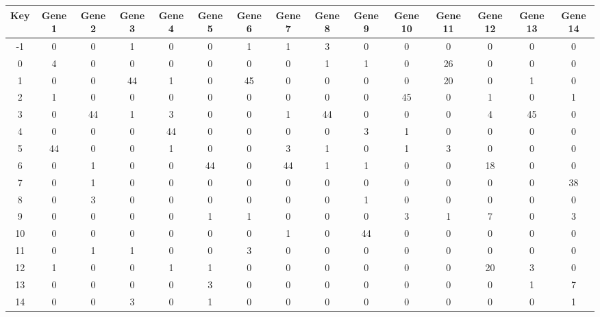 \begin{tabular}{|c|c|c|c|c|c|c|c|c|c|c|c|c|c|c|}
\hline
Key & Gene 1 & Gene 2 & Gene 3 & Gene 4 & Gene 5 & Gene 6 & Gene 7 & Gene 8 & Gene 9 & Gene 10 & Gene 11 & Gene 12 & Gene 13 & Gene 14 \\
\hline
-1 & 0 & 0 & 1 & 0 & 0 & 1 & 1 & 3 & 0 & 0 & 0 & 0 & 0 & 0 \\
0 & 4 & 0 & 0 & 0 & 0 & 0 & 0 & 1 & 1 & 0 & 26 & 0 & 0 & 0 \\
1 & 0 & 0 & 44 & 1 & 0 & 45 & 0 & 0 & 0 & 0 & 20 & 0 & 1 & 0 \\
2 & 1 & 0 & 0 & 0 & 0 & 0 & 0 & 0 & 0 & 45 & 0 & 1 & 0 & 1 \\
3 & 0 & 44 & 1 & 3 & 0 & 0 & 1 & 44 & 0 & 0 & 0 & 4 & 45 & 0 \\
4 & 0 & 0 & 0 & 44 & 0 & 0 & 0 & 0 & 3 & 1 & 0 & 0 & 0 & 0 \\
5 & 44 & 0 & 0 & 1 & 0 & 0 & 3 & 1 & 0 & 1 & 3 & 0 & 0 & 0 \\
6 & 0 & 1 & 0 & 0 & 44 & 0 & 44 & 1 & 1 & 0 & 0 & 18 & 0 & 0 \\
7 & 0 & 1 & 0 & 0 & 0 & 0 & 0 & 0 & 0 & 0 & 0 & 0 & 0 & 38 \\
8 & 0 & 3 & 0 & 0 & 0 & 0 & 0 & 0 & 1 & 0 & 0 & 0 & 0 & 0 \\
9 & 0 & 0 & 0 & 0 & 1 & 1 & 0 & 0 & 0 & 3 & 1 & 7 & 0 & 3 \\
10 & 0 & 0 & 0 & 0 & 0 & 0 & 1 & 0 & 44 & 0 & 0 & 0 & 0 & 0 \\
11 & 0 & 1 & 1 & 0 & 0 & 3 & 0 & 0 & 0 & 0 & 0 & 0 & 0 & 0 \\
12 & 1 & 0 & 0 & 1 & 1 & 0 & 0 & 0 & 0 & 0 & 0 & 20 & 3 & 0 \\
13 & 0 & 0 & 0 & 0 & 3 & 0 & 0 & 0 & 0 & 0 & 0 & 0 & 1 & 7 \\
14 & 0 & 0 & 3 & 0 & 1 & 0 & 0 & 0 & 0 & 0 & 0 & 0 & 0 & 1 \\
\hline
\end{tabular}